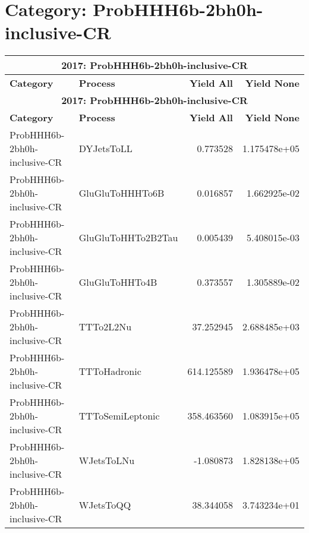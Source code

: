 \documentclass{article}
\begin{document}
\section*{Category: ProbHHH6b-2bh0h-inclusive-CR}
\begin{longtable}[c]{|l|l|r|r|}
\hline
\multicolumn{4}{|c|}{\textbf{2017: ProbHHH6b-2bh0h-inclusive-CR}} \\
\hline
\textbf{Category} & \textbf{Process} & \textbf{Yield All} & \textbf{Yield None} \\
\hline
\endfirsthead
\hline
\multicolumn{4}{|c|}{\textbf{2017: ProbHHH6b-2bh0h-inclusive-CR}} \\
\hline
\textbf{Category} & \textbf{Process} & \textbf{Yield All} & \textbf{Yield None} \\
\hline
\endhead
ProbHHH6b-2bh0h-inclusive-CR & DYJetsToLL & 0.773528 & 1.175478e+05 \\
\hline
ProbHHH6b-2bh0h-inclusive-CR & GluGluToHHHTo6B & 0.016857 & 1.662925e-02 \\
\hline
ProbHHH6b-2bh0h-inclusive-CR & GluGluToHHTo2B2Tau & 0.005439 & 5.408015e-03 \\
\hline
ProbHHH6b-2bh0h-inclusive-CR & GluGluToHHTo4B & 0.373557 & 1.305889e-02 \\
\hline
ProbHHH6b-2bh0h-inclusive-CR & TTTo2L2Nu & 37.252945 & 2.688485e+03 \\
\hline
ProbHHH6b-2bh0h-inclusive-CR & TTToHadronic & 614.125589 & 1.936478e+05 \\
\hline
ProbHHH6b-2bh0h-inclusive-CR & TTToSemiLeptonic & 358.463560 & 1.083915e+05 \\
\hline
ProbHHH6b-2bh0h-inclusive-CR & WJetsToLNu & -1.080873 & 1.828138e+05 \\
\hline
ProbHHH6b-2bh0h-inclusive-CR & WJetsToQQ & 38.344058 & 3.743234e+01 \\
\hline
\end{longtable}
\end{document}
